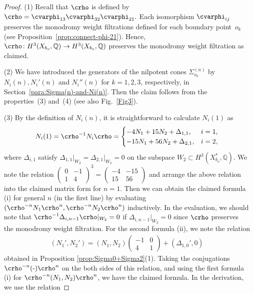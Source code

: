\documentclass[10pt,a4paper]{amsart}
\numberwithin{equation}{section}
\begin{document}
\begin{proof} (1) Recall that $\crho$ is defined by $\crho=\cvarphi_{13}\cvarphi_{32}\cvarphi_{21}.$ Each isomorphism $\cvarphi_{ij}$ preserves the monodromy weight filtrations defined for each boundary point~$o_{k}$ (see Proposition~\ref{prop:connect-phi-21}). Hence, $\crho\colon H^{3}(X_{b_{o}},\mathbb{Q})\to H^{3}(X_{b_{o}},\mathbb{Q})$ preserves the monodromy weight filtration as claimed.

(2) We have introduced the generators of the nilpotent cones $\Sigma_{o_{k}}^{(n)}$ by $N_{i}(n),N_{i}'(n)$ and $N_{i}''(n)$ for $k=1,2,3$, respectively, in Section~\ref{para:Sigma(n)-and-Ni(n)}. Then the claim follows from the properties~(3) and~(4) (see also Fig.~\ref{Fig3}).

(3) By the definition of $N_{i}(n)$, it is straightforward to calculate $N_{i}(1)$ as
\begin{gather*}
N_{i}(1)=\crho^{-1}N_{i}\crho=\begin{cases}
-4N_{1}+15N_{2}+\Delta_{1,1}, & i=1,\\
-15N_{1}+56N_{2}+\Delta_{2,1}, & i=2,
\end{cases}
\end{gather*}
where $\Delta_{i,1}$ satisfy $\Delta_{1,1}\vert_{W_{2}}=\Delta_{2,1}\vert_{W_{2}}=0$ on the subspace $W_{2}\subset H^{3}(X_{b_{o}}^{*},\mathbb{Q})$. We note the relation $\left(\begin{smallmatrix}0 & -1\\
1 & 4 \end{smallmatrix}\right)^{3}=\left(\begin{smallmatrix}-4 & -15\\
15 & 56 \end{smallmatrix}\right)$ and arrange the above relation into the claimed matrix form for $n=1$. Then we can obtain the claimed formula (i) for general $n$ (in the first line) by evaluating $(\crho^{-n}N_{1}\crho^{n},\crho^{-n}N_{2}\crho^{n})$ inductively. In the evaluation, we should note that $\crho^{-1}\Delta_{i,n-1}\crho\vert_{W_{2}}=0$ if $\Delta_{i,n-1}\vert_{W_{2}}=0$ since $\crho$ preserves the monodromy weight filtration. For the second formula (ii), we note the relation
\begin{gather*}
(N_{1}',N_{2}')=(N_{1},N_{2})\left(\begin{matrix}-1 & 0\\
4 & 1
\end{matrix}\right)+(\Delta_{1,0}',0)
\end{gather*}
obtained in Proposition \ref{prop:Sigma0+Sigma2}(1). Taking the conjugations $\crho^{-n}(\text{-})\crho^{n}$ on the both sides of this relation, and using the first formula (i) for $\crho^{-n}(N_{1},N_{2})\crho^{n}$, we have the claimed formula. In the derivation, we use the relation

\end{proof}
\end{document}

